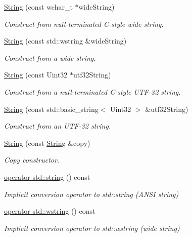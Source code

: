 \begin{DoxyCompactItemize}
\hyperlink{classsf_1_1String_a5742d0a9b0c754f711820c2b5c40fa55}{String} (const wchar\+\_\+t $\ast$wide\+String)
\begin{DoxyCompactList}\small\item\em Construct from null-\/terminated C-\/style wide string. \end{DoxyCompactList}\item 
\hyperlink{classsf_1_1String_a5e38151340af4f9a5f74ad24c0664074}{String} (const std\+::wstring \&wide\+String)
\begin{DoxyCompactList}\small\item\em Construct from a wide string. \end{DoxyCompactList}\item 
\hyperlink{classsf_1_1String_aea3629adf19f9fe713d4946f6c75b214}{String} (const Uint32 $\ast$utf32\+String)
\begin{DoxyCompactList}\small\item\em Construct from a null-\/terminated C-\/style U\+T\+F-\/32 string. \end{DoxyCompactList}\item 
\hyperlink{classsf_1_1String_a6eee86dbe75d16bbcc26e97416c2e1ca}{String} (const std\+::basic\+\_\+string$<$ Uint32 $>$ \&utf32\+String)
\begin{DoxyCompactList}\small\item\em Construct from an U\+T\+F-\/32 string. \end{DoxyCompactList}\item 
\hyperlink{classsf_1_1String_af862594d3c4070d8ddbf08cf8dce4f59}{String} (const \hyperlink{classsf_1_1String}{String} \&copy)
\begin{DoxyCompactList}\small\item\em Copy constructor. \end{DoxyCompactList}\item 
\hyperlink{classsf_1_1String_a884816a0f688cfd48f9324c9741dc257}{operator std\+::string} () const
\begin{DoxyCompactList}\small\item\em Implicit conversion operator to std\+::string (A\+N\+SI string) \end{DoxyCompactList}\item 
\hyperlink{classsf_1_1String_a6bd1444bebaca9bbf01ba203061f5076}{operator std\+::wstring} () const
\begin{DoxyCompactList}\small\item\em Implicit conversion operator to std\+::wstring (wide string) \end{DoxyCompactList}\item 

\end{DoxyCompactItemize}
